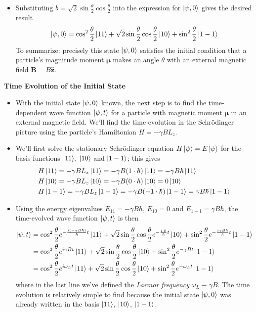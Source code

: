 \documentclass[11pt, a4paper]{article}
\newcommand{\schro}{Schr\"{o}dinger\xspace}
\renewcommand{\vec}[1]{\bm{#1}} %
\newcommand{\uvec}[1]{\hat{\vec{#1}}} %
\newcommand{\m}{\vec{\mu}}  %
\begin{document}
\begin{itemize}
	\item Substituting $ b = \sqrt{2}\sin \frac{\theta}{2} \cos \frac{\theta}{2} $ into the expression for $ \ket{\psi, 0} $ gives the desired result
	\begin{equation*}
		\ket{\psi, 0} = \cos^{2} \frac{\theta}{2} \ket{11} + \sqrt{2}\sin \frac{\theta}{2} \cos \frac{\theta}{2} \ket{10} + \sin^{2}\frac{\theta}{2} \ket{1 -1}
	\end{equation*}
	To summarize: precisely this state $ \ket{\psi, 0} $ satisfies the initial condition that a particle's magnitude moment $ \m $ makes an angle $ \theta $ with an external magnetic field $ \vec{B} = B \uvec{z} $. 
\end{itemize}

\textbf{Time Evolution of the Initial State}
\begin{itemize}
	\item With the initial state $ \ket{\psi, 0} $ known, the next step is to find the time-dependent wave function $ \ket{\psi, t} $ for a particle with magnetic moment $ \m $ in an external magnetic field. We'll find the time evolution in the \schro picture using the particle's Hamiltonian $ H = -\gamma BL_{z}  $. 
	
	\item We'll first solve the stationary \schro equation $ H \ket{\psi} = E \ket{\psi} $ for the basis functions $ \ket{11} $, $ \ket{10} $ and $ \ket{1-1} $; this gives
	\begin{align*}
		&H \ket{11} = - \gamma BL_{z}\ket{11} = -\gamma B (1\cdot \hbar) \ket{11} = -\gamma B \hbar \ket{11}\\
		&H\ket{10} = - \gamma BL_{z}\ket{10} = -\gamma B (0\cdot \hbar) \ket{10} = 0 \ket{10}\\
		&H \ket{1-1} = - \gamma BL_{z}\ket{1-1} = -\gamma B (-1\cdot \hbar) \ket{1-1} = \gamma B \hbar \ket{1-1}
	\end{align*}
	
	\item Using the energy eigenvalues $ E_{11} = -\gamma B \hbar $, $ E_{10} = 0 $ and $ E_{1-1} = \gamma B \hbar $, the time-evolved wave function $ \ket{\psi, t} $ is then
	\begin{align*}
		\ket{\psi, t} &= \cos^{2} \frac{\theta}{2} e^{-\frac{i(-\gamma B\hbar)}{\hbar}t}\ket{11} + \sqrt{2}\sin \frac{\theta}{2} \cos \frac{\theta}{2} e^{-\frac{i\cdot 0}{\hbar}t}\ket{10} + \sin^{2}\frac{\theta}{2} e^{-\frac{i\gamma B\hbar}{\hbar}t}\ket{1 -1}\\
		&=\cos^{2} \frac{\theta}{2} e^{i\gamma B t}\ket{11} + \sqrt{2}\sin \frac{\theta}{2} \cos \frac{\theta}{2} \ket{10} + \sin^{2}\frac{\theta}{2} e^{-\gamma B t}\ket{1 -1}\\
		&=\cos^{2} \frac{\theta}{2} e^{i \omega_{L} t}\ket{11} + \sqrt{2}\sin \frac{\theta}{2} \cos \frac{\theta}{2} \ket{10} + \sin^{2}\frac{\theta}{2} e^{-\omega_{L} t}\ket{1 -1}
	\end{align*}
	where in the last line we've defined the \textit{Larmor frequency} $ \omega_{L} \equiv \gamma B $. 	The time evolution is relatively simple to find because the initial state $ \ket{\psi, 0} $ was already written in the basis $ \ket{11} $, $ \ket{10} $, $ \ket{1-1} $. 
	

\end{itemize}
\end{document}
